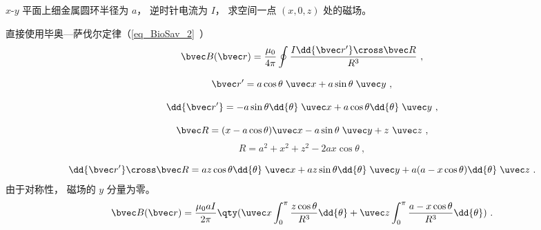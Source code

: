 
\begin{issues}
\issueDraft
\end{issues}


$x$-$y$ 平面上细金属圆环半径为 $a$， 逆时针电流为 $I$， 求空间一点 $(x, 0, z)$ 处的磁场。

直接使用毕奥—萨伐尔定律（\autoref{eq_BioSav_2}~）
\begin{equation}
\bvec B(\bvec r) = \frac{\mu_0}{4\pi} \oint \frac{I \dd{\bvec r'} \cross \bvec R}{R^3}~,
\end{equation}

\begin{equation}
\bvec r' = a\cos\theta\; \uvec x + a\sin\theta\; \uvec y~,
\end{equation}

\begin{equation}
\dd{\bvec r'} = -a\sin \theta \dd{\theta}\; \uvec x + a\cos \theta \dd{\theta}\; \uvec y~,
\end{equation}

\begin{equation}
\bvec R = (x - a\cos\theta)\uvec x - a\sin\theta \;\uvec y+ z\ \uvec z~,
\end{equation}
\begin{equation}
R = a^2 + x^2 + z^2 - 2ax\cos\theta~,
\end{equation}

\begin{equation}
\dd{\bvec r'} \cross \bvec R = az \cos\theta \dd{\theta} \;\uvec x + az\sin\theta \dd{\theta} \;\uvec y + a(a - x\cos\theta)\dd{\theta}\;\uvec z~.
\end{equation}
由于对称性， 磁场的 $y$ 分量为零。
\begin{equation}
\bvec B(\bvec r) = \frac{\mu_0 a I}{2\pi} \qty(\uvec x\int_0^\pi \frac{z \cos\theta}{R^3} \dd{\theta} + \uvec z\int_0^\pi \frac{a - x\cos\theta}{R^3} \dd{\theta})~.
\end{equation}
